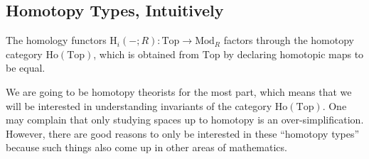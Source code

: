 \documentclass[../notes.tex]{subfiles}
\begin{document}
\subsection{Homotopy Types, Intuitively}
The homology functors $\mathrm H_i(-;R)\colon\mathrm{Top}\to\mathrm{Mod}_R$ factors through the homotopy category $\mathrm{Ho}(\mathrm{Top})$, which is obtained from $\mathrm{Top}$ by declaring homotopic maps to be equal.

We are going to be homotopy theorists for the most part, which means that we will be interested in understanding invariants of the category $\mathrm{Ho}(\mathrm{Top})$. One may complain that only studying spaces up to homotopy is an over-simplification. However, there are good reasons to only be interested in these ``homotopy types'' because such things also come up in other areas of mathematics.
\end{document}

